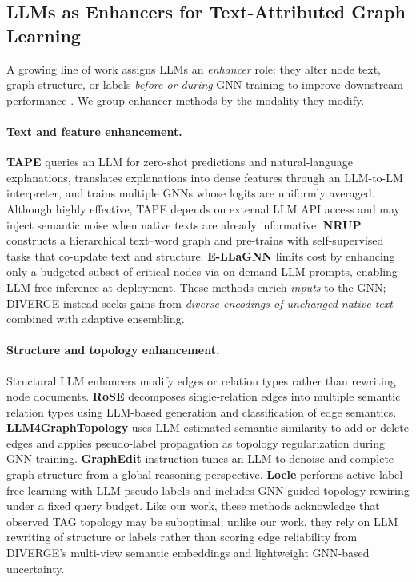 \documentclass{article}
\begin{document}
\subsection{LLMs as Enhancers for Text-Attributed Graph Learning}
\label{sec:llm-enhancers}

A growing line of work assigns LLMs an \emph{enhancer} role: they alter node text,
graph structure, or labels \emph{before or during} GNN training to improve downstream
performance \citep{Jin2023LLMGraphs,Chen2024LLMGraphs,Li2024GraphLLMSurvey,Wu2025LLMNode}.
We group enhancer methods by the modality they modify.

\paragraph{Text and feature enhancement.}
\textbf{TAPE} \citep{he2024harnessing} queries an LLM for zero-shot predictions and
natural-language explanations, translates explanations into dense features through an
LLM-to-LM interpreter, and trains multiple GNNs whose logits are uniformly averaged.
Although highly effective, TAPE depends on external LLM API access and may inject
semantic noise when native texts are already informative. \textbf{NRUP}
\citep{kuang2023unleashing} constructs a hierarchical text--word graph and pre-trains
with self-supervised tasks that co-update text and structure. \textbf{E-LLaGNN}
\citep{Jaiswal2024AllAgainstSome} limits cost by enhancing only a budgeted subset of
critical nodes via on-demand LLM prompts, enabling LLM-free inference at deployment.
These methods enrich \emph{inputs} to the GNN; DIVERGE instead seeks gains from
\emph{diverse encodings of unchanged native text} combined with adaptive ensembling.

\paragraph{Structure and topology enhancement.}
Structural LLM enhancers modify edges or relation types rather than rewriting node
documents. \textbf{RoSE} decomposes single-relation edges into multiple semantic
relation types using LLM-based generation and classification of edge semantics.
\textbf{LLM4GraphTopology} \citep{Sun2026TopologicalEnhancerTAG} uses LLM-estimated
semantic similarity to add or delete edges and applies pseudo-label propagation as
topology regularization during GNN training. \textbf{GraphEdit} \citep{guo2024graphedit}
instruction-tunes an LLM to denoise and complete graph structure from a global
reasoning perspective. \textbf{Locle} \citep{zhang2025leveraging} performs active
label-free learning with LLM pseudo-labels and includes GNN-guided topology rewiring
under a fixed query budget. Like our work, these methods acknowledge that observed TAG
topology may be suboptimal; unlike our work, they rely on LLM rewriting of structure
or labels rather than scoring edge reliability from DIVERGE's multi-view semantic
embeddings and lightweight GNN-based uncertainty.
\end{document}
